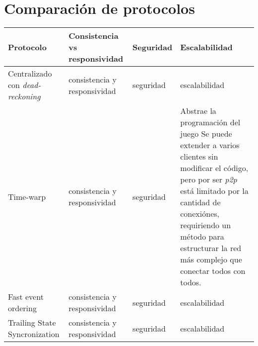 \section{Comparación de protocolos}

%

\small
\begin{longtable}{|p{2cm}|p{4cm}|p{4cm}|p{4cm}|}
\hline
\textbf{Protocolo} & \textbf{Consistencia vs responsividad} & \textbf{Seguridad} & \textbf{Escalabilidad} \\ \hline
Centralizado con \emph{dead-reckoning} &
consistencia y responsividad &
seguridad &
escalabilidad \\
\hline
Time-warp &
consistencia y responsividad &
seguridad &
Abstrae la programación del juego \newline
Se puede extender a varios clientes sin modificar el código, pero por ser \emph{p2p} está limitado por la cantidad de conexiónes, requiriendo un método para estructurar la red más complejo que conectar todos con todos. \\
\hline
Fast event ordering &
consistencia y responsividad &
seguridad &
escalabilidad \\
\hline
Trailing State Syncronization &
consistencia y responsividad &
seguridad &
escalabilidad \\
\hline
\end{longtable}
\normalsize
